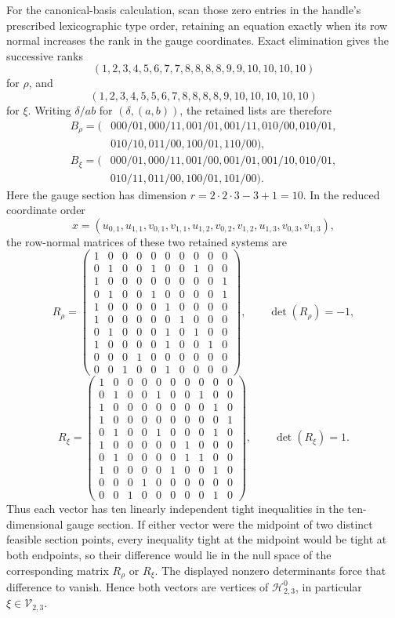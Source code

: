 For the canonical-basis calculation, scan those zero entries in the handle's prescribed lexicographic type order, retaining an equation exactly when its row normal increases the rank in the gauge coordinates. Exact elimination gives the successive ranks
\[(1,2,3,4,5,6,7,7,8,8,8,8,9,9,10,10,10,10)\]
for \(\rho\), and
\[(1,2,3,4,5,5,6,7,8,8,8,8,9,10,10,10,10,10)\]
for \(\xi\). Writing \(\delta/ab\) for \((\delta,(a,b))\), the retained lists are therefore
\[\begin{aligned}B_{\rho}=(&000/01,000/11,001/01,001/11,010/00,010/01,\\&010/10,011/00,100/01,110/00),\end{aligned}\]
\[\begin{aligned}B_{\xi}=(&000/01,000/11,001/00,001/01,001/10,010/01,\\&010/11,011/00,100/01,101/00).\end{aligned}\]
Here the gauge section has dimension \(r=2\cdot2\cdot3-3+1=10\). In the reduced coordinate order
\[x=(u_{0,1},u_{1,1},v_{0,1},v_{1,1},u_{1,2},v_{0,2},v_{1,2},u_{1,3},v_{0,3},v_{1,3}),\]
the row-normal matrices of these two retained systems are
\[R_{\rho}=\begin{pmatrix}1&0&0&0&0&0&0&0&0&0\\0&1&0&0&1&0&0&1&0&0\\1&0&0&0&0&0&0&0&0&1\\0&1&0&0&1&0&0&0&0&1\\1&0&0&0&0&1&0&0&0&0\\1&0&0&0&0&0&1&0&0&0\\0&1&0&0&0&1&0&1&0&0\\1&0&0&0&0&1&0&0&1&0\\0&0&0&1&0&0&0&0&0&0\\0&0&1&0&0&1&0&0&0&0\end{pmatrix},\qquad\det(R_{\rho})=-1,\]
\[R_{\xi}=\begin{pmatrix}1&0&0&0&0&0&0&0&0&0\\0&1&0&0&1&0&0&1&0&0\\1&0&0&0&0&0&0&0&1&0\\1&0&0&0&0&0&0&0&0&1\\0&1&0&0&1&0&0&0&1&0\\1&0&0&0&0&0&1&0&0&0\\0&1&0&0&0&0&1&1&0&0\\1&0&0&0&0&1&0&0&1&0\\0&0&0&1&0&0&0&0&0&0\\0&0&1&0&0&0&0&0&1&0\end{pmatrix},\qquad\det(R_{\xi})=1.\]
Thus each vector has ten linearly independent tight inequalities in the ten-dimensional gauge section. If either vector were the midpoint of two distinct feasible section points, every inequality tight at the midpoint would be tight at both endpoints, so their difference would lie in the null space of the corresponding matrix \(R_{\rho}\) or \(R_{\xi}\). The displayed nonzero determinants force that difference to vanish. Hence both vectors are vertices of \(\mathcal H^0_{2,3}\), in particular \(\xi\in\mathcal V_{2,3}\).

